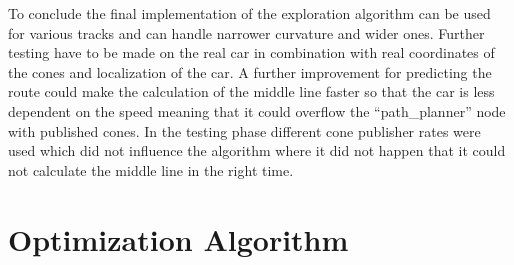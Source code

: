 To conclude the final implementation of the exploration algorithm can be used for various tracks and can handle narrower curvature and wider ones. Further testing have to be made on the real car in combination with real coordinates of the cones and localization of the car. A further improvement for predicting the route could make the calculation of the middle line faster so that the car is less dependent on the speed meaning that it could overflow the ``path\_planner'' node with published cones. In the testing phase different cone publisher rates were used which did not influence the algorithm where it did not happen that it could not calculate the middle line in the right time.

\section{Optimization Algorithm}
\lipsum[1]